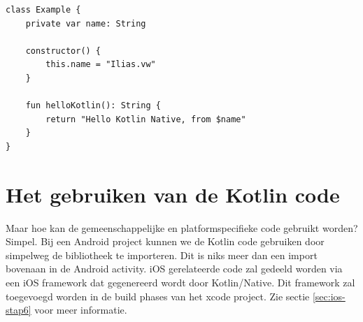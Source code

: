\begin{lstlisting}
class Example {
	private var name: String
	
	constructor() {
		this.name = "Ilias.vw"
	}
	
	fun helloKotlin(): String {
		return "Hello Kotlin Native, from $name"
	}
}
\end{lstlisting}

\section {Het gebruiken van de Kotlin code}
\label{sec:use-ios-code}
Maar hoe kan de gemeenschappelijke en platformspecifieke code gebruikt worden? Simpel. Bij een Android project kunnen we de Kotlin code gebruiken door simpelweg de bibliotheek te importeren. Dit is niks meer dan een import bovenaan in de Android activity. iOS gerelateerde code zal gedeeld worden via een iOS framework dat gegenereerd wordt door Kotlin/Native. Dit framework zal toegevoegd worden in de build phases van het xcode project. Zie sectie \ref{sec:ios-stap6} voor meer informatie.